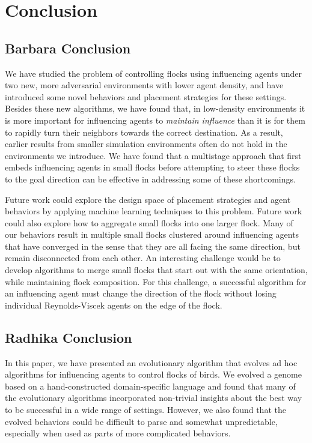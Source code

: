 \chapter{Conclusion}
\label{ch:conclusion}

\section{Barbara Conclusion}
We have studied the problem of controlling flocks using influencing agents
under two new, more adversarial environments with lower agent density, and
have introduced some novel behaviors and placement strategies for these settings.
Besides these new algorithms, we have found that, in low-density
environments it is more important for influencing agents to
\textit{maintain influence} than it is for them to rapidly turn their
neighbors towards the correct destination.
As a result, earlier results from smaller simulation environments often do
not hold in the environments we introduce.
We have found that a multistage approach that first embeds influencing
agents in small flocks before attempting to steer these flocks to the goal
direction can be effective in addressing some of these shortcomings.

Future work could explore the design space of placement strategies and agent
behaviors by applying machine learning techniques to this problem.
Future work could also explore how to aggregate small flocks into one larger
flock.
Many of our behaviors result in multiple small flocks clustered around
influencing agents that have converged in the sense that they are all facing the
same direction, but remain disconnected from each other.
An interesting challenge would be to develop algorithms to merge small flocks that
start out with the same orientation, while maintaining flock composition.
For this challenge, a successful algorithm for an influencing agent must change
the direction of the flock without losing individual Reynolds-Viscek agents on
the edge of the flock.

\section{Radhika Conclusion}
In this paper, we have presented an evolutionary algorithm that evolves
ad hoc algorithms for influencing agents to control flocks of birds.
We evolved a genome based on a hand-constructed domain-specific language
and found that many of the evolutionary algorithms incorporated non-trivial
insights about the best way to be successful in a wide range of settings.
However, we also found that the evolved behaviors could be difficult to 
parse and somewhat unpredictable, especially when used as parts of more
complicated behaviors.

